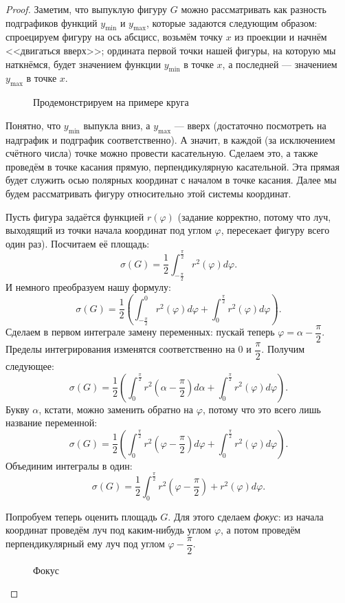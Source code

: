 \begin{proof}
	Заметим, что выпуклую фигуру \(G\) можно рассматривать как разность подграфиков функций \(y_{\min}\) и \(y_{\max}\),  которые задаются следующим образом: спроецируем фигуру на ось абсцисс, возьмём точку \(x\) из проекции и начнём <<двигаться вверх>>; ордината первой точки нашей фигуры, на которую мы наткнёмся, будет значением функции \(y_{\min}\) в точке \(x\), а последней --- значением  \(y_{\max}\) в точке \(x\).
	\begin{figure}
		\caption{Продемонстрируем на примере круга}
	\end{figure}
	
	Понятно, что \(y_{\min}\) выпукла вниз, а \(y_{\max}\) --- вверх (достаточно посмотреть на надграфик и подграфик соответственно). А значит, в каждой (за исключением счётного числа) точке можно провести касательную. Сделаем это, а также проведём в точке касания прямую, перпендикулярную касательной. Эта прямая будет служить осью полярных координат с началом в точке касания. Далее мы будем рассматривать фигуру относительно этой системы координат.
	
	Пусть фигура задаётся функцией \(r(\varphi)\) (задание корректно, потому что луч, выходящий из точки начала координат под углом \(\varphi\), пересекает фигуру всего один раз). Посчитаем её площадь: \[
		\sigma(G) = \frac{1}{2} \int_{-\frac{\pi}{2}}^{\frac{\pi}{2}} r^2(\varphi) d\varphi.
	\]
	И немного преобразуем нашу формулу: \[
		\sigma(G) = \frac{1}{2} \left(\int_{-\frac{\pi}{2}}^{0} r^2(\varphi) d\varphi + \int_{0}^{\frac{\pi}{2}} r^2(\varphi) d\varphi \right).
	\]
	Сделаем в первом интеграле замену переменных: пускай теперь \(\varphi = \alpha - \dfrac{\pi}{2}\). Пределы интегрирования изменятся соответственно на \(0\) и \(\dfrac{\pi}{2}\). Получим следующее: \[
		\sigma(G) = \frac{1}{2} \left(\int_{0}^{\frac{\pi}{2}} r^2 \left(\alpha - \frac{\pi}{2} \right) d\alpha + \int_{0}^{\frac{\pi}{2}} r^2(\varphi) d\varphi \right).
	\]
	Букву \(\alpha\), кстати, можно заменить обратно на \(\varphi\), потому что это всего лишь название переменной: \[
		\sigma(G) = \frac{1}{2} \left(\int_{0}^{\frac{\pi}{2}} r^2 \left(\varphi - \frac{\pi}{2} \right) d\varphi + \int_{0}^{\frac{\pi}{2}} r^2(\varphi) d\varphi \right).
	\]
	Объединим интегралы в один: \[
		\sigma(G) = \frac{1}{2} \int_{0}^{\frac{\pi}{2}} r^2 \left(\varphi - \frac{\pi}{2} \right) +  r^2(\varphi) d\varphi.
	\]
	
	Попробуем теперь оценить площадь \(G\).	Для этого сделаем \textit{фокус}: из начала координат проведём луч под каким-нибудь углом \(\varphi\), а потом проведём перпендикулярный ему луч под углом \(\varphi - \dfrac{\pi}{2}\).
	\begin{figure}[h!]
		\caption{Фокус}
	\end{figure}
	

\end{proof}
